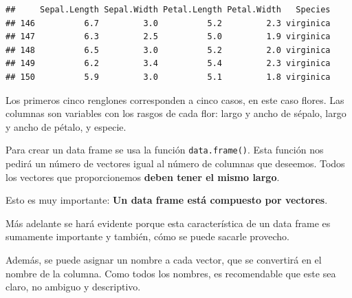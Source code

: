 \documentclass[
]{book}
\begin{document}
\begin{verbatim}
##     Sepal.Length Sepal.Width Petal.Length Petal.Width   Species
## 146          6.7         3.0          5.2         2.3 virginica
## 147          6.3         2.5          5.0         1.9 virginica
## 148          6.5         3.0          5.2         2.0 virginica
## 149          6.2         3.4          5.4         2.3 virginica
## 150          5.9         3.0          5.1         1.8 virginica
\end{verbatim}

Los primeros cinco renglones corresponden a cinco casos, en este caso flores. Las columnas son variables con los rasgos de cada flor: largo y ancho de sépalo, largo y ancho de pétalo, y especie.

Para crear un data frame se usa la función \texttt{data.frame()}. Esta función nos pedirá un número de vectores igual al número de columnas que deseemos. Todos los vectores que proporcionemos \textbf{deben tener el mismo largo}.

Esto es muy importante: \textbf{Un data frame está compuesto por vectores}.

Más adelante se hará evidente porque esta característica de un data frame es sumamente importante y también, cómo se puede sacarle provecho.

Además, se puede asignar un nombre a cada vector, que se convertirá en el nombre de la columna. Como todos los nombres, es recomendable que este sea claro, no ambiguo y descriptivo.
\end{document}

